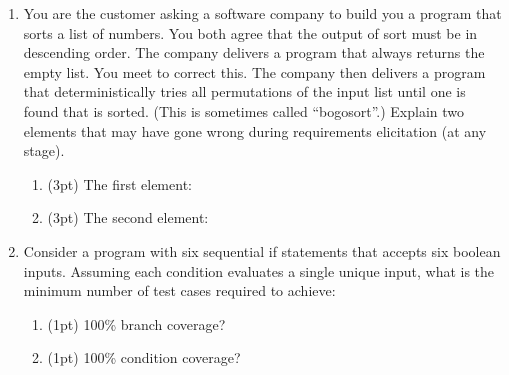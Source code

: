 \documentclass{report}
\newif\ifkey
\newcommand{\answershort}[1]{\ifkey\color{red}\underline{\textbf{#1}}\color{black}\else\underline{\hspace{3in}}\fi\xspace}
\newcommand{\answerlong}[1]{\ifkey\color{red}\textbf{#1}\color{black}\else\vspace{0.5in}\fi\xspace}
\newcommand*{\pts}[1]{\addtocounter{points}{#1}(#1pt)}
\begin{document}
\begin{spacing}{1.4}
\begin{enumerate}[leftmargin=*]
\item You are the customer asking a software company to build you a program that
  sorts a list of numbers. You both agree that the output of sort must be in descending order.
  The company delivers a program that always returns the empty list. You meet to correct
  this. The company then delivers a program that deterministically tries all permutations
  of the input list until one is found that is sorted. (This is sometimes called “bogosort”.)
  Explain two elements that may have gone wrong during requirements
  elicitation (at any stage).
  \begin{enumerate}
  \item \pts{3} The first element:\\
    \answerlong{There was an omission in the functional requirements: the customer failed to state that
      the returned list must have the same elements as the input list.}
  \item \pts{3} The second element:\\
    \answerlong{Quality requirements were not discussed: bogosort is O(n!), which is much slower than
      sorting a list ought to be (O(nlogn)). Other well-reasoned answers are also possible.}
    \end{enumerate}

\item Consider a program with six sequential if statements that accepts six boolean
inputs. Assuming each condition evaluates a single unique input, what is the minimum
number of test cases required to achieve:
\begin{enumerate}
\item \pts{1} 100\% branch coverage? \answershort{2: one all false, one all true}
\item \pts{1} 100\% condition coverage? \answershort{12 = 2*6}
\end{enumerate}



\end{enumerate}
\end{spacing}
\end{document}
